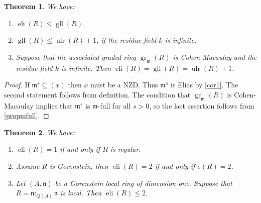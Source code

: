 \documentclass[a4paper,12pt]{amsart}
\newtheorem{thm}{\bf Theorem}[section]
\theoremstyle{definition}
\theoremstyle{remark}
\numberwithin{equation}{section}
\DeclareMathOperator{\gr}{{{gr}}}
\DeclareMathOperator{\eli}{{eli}}
\DeclareMathOperator{\gll}{gll}
\DeclareMathOperator{\ulr}{{ulr}}
\def\fn{\mathfrak{n}}
\def\fm{\mathfrak{m}}
\begin{document}
\begin{thm}\label{indexthm1} We have:
\begin{enumerate}
\item $\eli(R)\leq \gll(R)$. 
\item  $\gll(R)\leq \ulr(R)+1$, if the residue field $k$ is infinite.
\item Suppose that the associated graded ring $\gr_{\fm}(R)$ is Cohen-Macaulay and the residue field $k$ is infinite. Then $\eli(R) = \gll(R) = \ulr(R)+1$. 
\end{enumerate}
\end{thm}

\begin{proof}
If $\fm^s\subseteq (x)$ then $x$ must be a NZD. Thus $\fm^s$ is Elias by \ref{cor1}. The second statement follows from definition. The condition that $\gr_{\fm}(R)$ is Cohen-Macaulay implies that $\fm^s$ is $\fm$-full for all $s>0$, so the last assertion follows from \ref{propmfull}.
\end{proof}



\begin{thm}\label{indexthm2}
We have:
\begin{enumerate}
\item $\eli(R) =1$ if and only if $R$ is regular. 
\item Assume $R$ is Gorenstein, then $\eli(R)=2$ if and only if $e(R)=2$. 
\item Let $(A, \fn)$ be a Gorenstein local ring of dimension one. Suppose that $R=\fn:_{Q(A)}\fn$ is local. Then $\eli(R)\leq 2$. 
\end{enumerate}


\end{thm}
\end{document}
